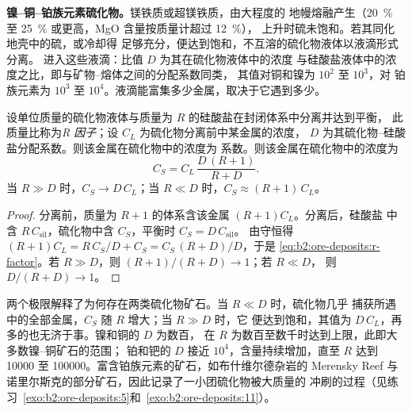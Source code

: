 \textbf{镍–铜–铂族元素硫化物。}镁铁质或超镁铁质，由大程度的
地幔熔融产生（\qty{20}{\percent} 至 \qty{25}{\percent} 或更高，MgO 含量按质量计超过 \qty{12}{\percent}），
上升时硫未饱和。若其同化地壳中的硫，或冷却得
足够充分，便达到饱和，不互溶的硫化物液体以液滴形式分离。
进入这些液滴：比值 $D$ 为其在硫化物液体中的浓度
与硅酸盐液体中的浓度之比，即与矿物–熔体之间的分配系数同类，
其值对铜和镍为 $10^2$ 至 $10^3$，对
铂族元素为 $10^3$ 至 $10^4$。液滴能富集多少金属，取决于它遇到多少。

\begin{proposition}[R 因子]\label{prop:b2:ore-deposits:r-factor}
设单位质量的硫化物液体与质量为 $R$ 的硅酸盐在封闭体系中分离并达到平衡，
此质量比称为\emph{R 因子}；设 $C_L$ 为硫化物分离前中某金属的浓度，
$D$ 为其硫化物–硅酸盐分配系数。则该金属在硫化物中的浓度为
系数。则该金属在硫化物中的浓度为
\begin{equation}
C_S = C_L\,\frac{D\,(R + 1)}{R + D} .
\label{eq:b2:ore-deposits:r-factor}
\end{equation}
当 $R \gg D$ 时，$C_S \to D\,C_L$；当 $R \ll D$ 时，$C_S \approx (R + 1)\,C_L$。
\end{proposition}

\begin{proof}
分离前，质量为 $R + 1$ 的体系含该金属 $(R + 1)C_L$。分离后，硅酸盐
中含 $R\,C_{\mathrm{sil}}$，硫化物中含 $C_S$，平衡时 $C_S = D\,C_{\mathrm{sil}}$。
由守恒得 $(R + 1)C_L = R\,C_S/D + C_S = C_S\,(R + D)/D$，于是
\eqref{eq:b2:ore-deposits:r-factor}。若 $R \gg D$，则 $(R + 1)/(R + D) \to 1$；若 $R \ll D$，
则 $D/(R + D) \to 1$。
\end{proof}

两个极限解释了为何存在两类硫化物矿石。当 $R \ll D$ 时，硫化物几乎
捕获所遇中的全部金属，$C_S$ 随 $R$ 增大；当 $R \gg D$ 时，它
便达到饱和，其值为 $D\,C_L$，再多的也无济于事。镍和铜的 $D$ 为数百，
在 $R$ 为数百至数千时达到上限，此即大多数镍–铜矿石的范围；
铂和钯的 $D$ 接近 $10^4$，含量持续增加，直至 $R$ 达到 \num{10000} 至
\num{100000}。富含铂族元素的矿石，如布什维尔德杂岩的 Merensky Reef 与
诺里尔斯克的部分矿石，因此记录了一小团硫化物被大质量的
冲刷的过程（见练习~\ref{exo:b2:ore-deposits:5}和~\ref{exo:b2:ore-deposits:11}）。

